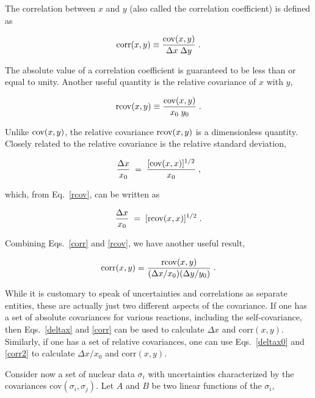 \noindent
The correlation between $x$ and $y$ (also called the correlation
coefficient) is defined as

\begin{equation}
{\rm corr}(x,y) \equiv \frac{{\rm cov}(x,y)}{\Delta x\;\Delta y} \;.
\label{corr}
\end{equation}

\noindent
The absolute value of a correlation coefficient is guaranteed to be
less than or equal to unity.  Another useful quantity is the relative
covariance of $x$ with $y$,

\begin{equation}
{\rm rcov}(x,y) \equiv \frac {{\rm cov}(x,y)}{x_0 \; y_0} \;.
\label{rcov}
\end{equation}

\noindent
Unlike ${\rm cov}(x,y)$, the relative
{\rm cov}ariance ${\rm rcov}(x,y)$ is a dimensionless quantity.
Closely related to the relative covariance is the relative standard
deviation,

\begin{equation}
\frac {\Delta x}{x_0} \;=\; \frac {[{\rm cov}(x,x)]^{1/2}}{x_0} \;,
\end{equation}

\noindent
which, from Eq.~\ref{rcov}, can be written as

\begin{equation}
\frac {\Delta x}{x_0}\; =\; [{\rm rcov}(x,x)]^{1/2} \; .
\label{deltax0}
\end{equation}

\noindent
Combining Eqs.~\ref{corr} and \ref{rcov}, we have another useful result,

\begin{equation}
{\rm corr}(x,y) = \frac{{\rm rcov}(x,y)}{(\Delta x/x_0) (\Delta y/y_0)}\;.
\label{corr2}
\end{equation}

While it is customary to speak of uncertainties
and correlations as separate entities, these
are actually just two different aspects of the covariance.  If one
has a set of absolute covariances for various reactions, including
the self-covariance, then Eqs.~\ref{deltax} and \ref{corr} can be used
to calculate $\Delta x$ and corr$(x,y)$.  Similarly, if one has a set
of relative covariances, one can use Eqs.~\ref{deltax0} and
\ref{corr2} to calculate $\Delta x/x_0$ and corr$(x,y)$.

Consider now a set of nuclear data $\sigma_i$ with uncertainties
characterized by the covariances {\rm cov}$(\sigma_i,\sigma_j)$.  Let
$A$ and $B$ be two linear functions of the $\sigma_i$,

